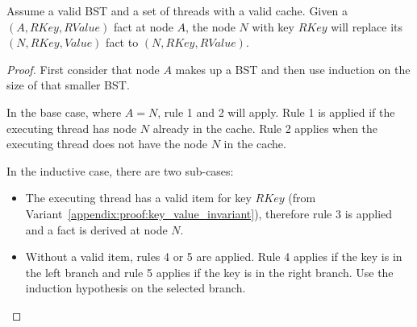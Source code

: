 \begin{theorem}
Assume a valid BST and a set of threads with a valid cache. Given a
$(A, RKey, RValue)$ fact at node $A$, the node $N$ with key $RKey$
will replace its $(N, RKey, Value)$ fact to $(N, RKey,
RValue)$.
\end{theorem}
\begin{proof}

First consider that node $A$ makes up a BST and then use induction on the size
of that smaller BST.

In the base case, where $A = N$, rule 1 and 2 will apply. Rule 1 is applied if
the executing thread has node $N$ already in the cache. Rule 2 applies when the
executing thread does not have the node $N$ in the cache.

In the inductive case, there are two sub-cases:

\begin{itemize}
   \item The executing thread has a valid  item for key $RKey$ (from
      Variant~\ref{appendix:proof:key_value_invariant}),
      therefore rule 3 is applied and a  fact is derived at node
      $N$.

   \item Without a valid  item, rules 4 or 5 are applied. Rule 4
      applies if the key is in the left branch and rule 5 applies if the key is
      in the right branch. Use the induction hypothesis on the selected branch.

\end{itemize}
\end{proof}
